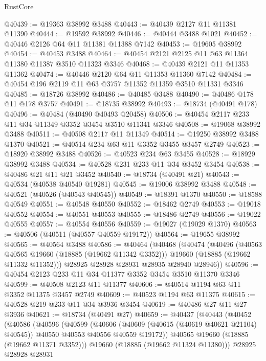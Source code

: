 \begin{lexlean}{RustCore}
\begin{coremodule}
@40439 := @19363 @38992 @3488
@40443 := @40439 @2127 @11 @11381 @11390
@40444 := @19592 @38992
@40446 := @40444 @3488 @1021
@40452 := @40446 @2126 @64 @11 @11381 @11388 @7142
@40453 := @19605 @38992
@40454 := @40453 @3488
@40464 := @40454 @2121 @2125 @11 @63 @11364 @11380 @11387 @3510 @11323 @3346
@40468 := @40439 @2121 @11 @11353 @11362
@40474 := @40446 @2120 @64 @11 @11353 @11360 @7142
@40484 := @40454 @196 @2119 @11 @63 @3757 @11352 @11359 @3510 @11331 @3346
@40485 := @18726 @38992
@40486 := @40485 @3488
@40490 := @40486 @178 @11 @178 @3757
@40491 := @18735 @38992
@40493 := @18734 (@40491 @178)
@40496 := @40484 (@40490 @40493 @20458)
@40506 := @40454 @2117 @233 @11 @34 @11349 @3352 @3454 @3510 @11341 @3346
@40508 := @19068 @38992 @3488
@40511 := @40508 @2117 @11 @11349
@40514 := @19250 @38992 @3488 @1370
@40521 := @40514 @234 @63 @11 @3352 @3455 @3457 @2749
@40523 := @18920 @38992 @3488
@40526 := @40523 @234 @63 @3455
@40528 := @18929 @38992 @3488
@40534 := @40528 @231 @233 @11 @34 @3452 @3454
@40538 := @40486 @21 @11 @21 @3452
@40540 := @18734 (@40491 @21)
@40543 := @40534 (@40538 @40540 @19281)
@40545 := @19006 @38992 @3488
@40548 := @40521 (@40526 (@40543 @40545))
@40549 := @18391 @1370
@40550 := @18588 @40549
@40551 := @40548 @40550
@40552 := @18462 @2749
@40553 := @19018 @40552
@40554 := @40551 @40553
@40555 := @18486 @2749
@40556 := @19022 @40555
@40557 := @40554 @40556
@40559 := @19027 (@19029 @1370)
@40563 := @40506 (@40511 (@40557 @40559 @19172))
@40564 := @19655 @38992
@40565 := @40564 @3488
@40586 := @40464
    (@40468
      (@40474
        (@40496
          (@40563 @40565 @19660 (@18885 (@19662 @11342 @3352)))
          @19660
          (@18885 (@19662 @11332 @11352)))
        @28925
        @28928
        @28931
        @28935
        @28940
        @28946))
@40596 := @40454 @2123 @233 @11 @34 @11377 @3352 @3454 @3510 @11370 @3346
@40599 := @40508 @2123 @11 @11377
@40606 := @40514 @1194 @63 @11 @3352 @11375 @3457 @2749
@40609 := @40523 @1194 @63 @11375
@40615 := @40528 @219 @233 @11 @34 @3936 @3454
@40619 := @40486 @27 @11 @27 @3936
@40621 := @18734 (@40491 @27)
@40659 := @40437
    (@40443
      (@40452
        (@40586
          (@40596
            (@40599
              (@40606
                (@40609 (@40615 (@40619 @40621 @21104) @40545))
                @40550
                @40553
                @40556
                @40559
                @19172))
            @40565
            @19660
            (@18885 (@19662 @11371 @3352)))
          @19660
          (@18885 (@19662 @11324 @11380)))
        @28925
        @28928
        @28931

\end{coremodule}
\end{lexlean}
